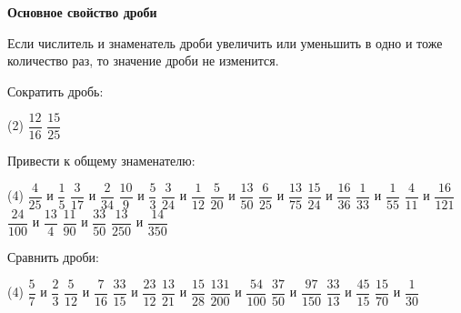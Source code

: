 \begin{class}[number=5]
	\begin{listofex}
	\item \textbf{Основное свойство дроби}
	
	Если числитель и знаменатель дроби увеличить или уменьшить в одно и тоже количество раз, то значение дроби не изменится.
	\item Сократить дробь:
	\begin{tasks}(2)
		\task \( \dfrac{12}{16} \)
		\task \( \dfrac{15}{25} \)
	\end{tasks}
	\item Привести к общему знаменателю:
	\begin{tasks}(4)
		\task \( \dfrac{4}{25} \) и \( \dfrac{1}{5} \)
		\task \( \dfrac{3}{17} \) и \( \dfrac{2}{34} \)
		\task \( \dfrac{10}{9} \) и \( \dfrac{5}{3} \)
		\task \( \dfrac{3}{24} \) и \( \dfrac{1}{12} \)
		\task \( \dfrac{5}{20} \) и \( \dfrac{13}{50} \)
		\task \( \dfrac{6}{25} \) и \( \dfrac{13}{75} \)
		\task \( \dfrac{15}{24} \) и \( \dfrac{16}{36} \)
		\task \( \dfrac{1}{33} \) и \( \dfrac{1}{55} \)
		\task \( \dfrac{4}{11} \) и \( \dfrac{16}{121} \)
		\task \( \dfrac{24}{100} \) и \( \dfrac{13}{4} \)
		\task \( \dfrac{11}{90} \) и \( \dfrac{33}{50} \)
		\task \( \dfrac{13}{250} \) и \( \dfrac{14}{350} \)
	\end{tasks}
	\item Сравнить дроби:
	\begin{tasks}(4)
		\task \( \dfrac{5}{7} \) и \( \dfrac{2}{3} \)
		\task \( \dfrac{5}{12} \) и \( \dfrac{7}{16} \)
		\task \( \dfrac{33}{15} \) и \( \dfrac{23}{12} \)
		\task \( \dfrac{13}{21} \) и \( \dfrac{15}{28} \)
		\task \( \dfrac{131}{200} \) и \( \dfrac{54}{100} \)
		\task \( \dfrac{37}{50} \) и \( \dfrac{97}{150} \)
		\task \( \dfrac{33}{13} \) и \( \dfrac{45}{15} \)
		\task \( \dfrac{15}{70} \) и \( \dfrac{1}{30} \)
	\end{tasks}
	\end{listofex}
\end{class}


